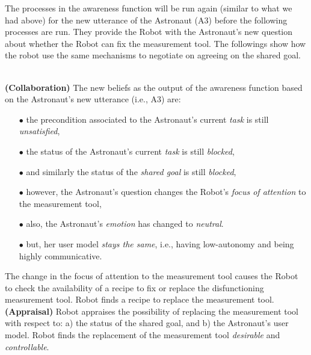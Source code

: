 The processes in the awareness function will be run again (similar to what we
had above) for the new utterance of the Astronaut (A3) before the following
processes are run. They provide the Robot with the Astronaut's new question
about whether the Robot can fix the measurement tool. The followings show how
the robot use the same mechanisms to negotiate on agreeing on the shared goal.

\noindent{}\\

\noindent\textbf{(Collaboration)} The new beliefs as the output of the awareness
function based on the Astronaut's new utterance (i.e., A3) are:

\begin{itemize}
  \item[$\bullet$] the precondition associated to the Astronaut's current
  \textit{task} is still \textit{unsatisfied},
  \item[$\bullet$] the status of the Astronaut's current \textit{task} is still
  \textit{blocked},
  \item[$\bullet$] and similarly the status of the \textit{shared goal} is
  still \textit{blocked},
  \item[$\bullet$] however, the Astronaut's question changes the Robot's
  \textit{focus of attention} to the measurement tool,
  \item[$\bullet$] also, the Astronaut's \textit{emotion} has changed to
  \textit{neutral}.
  \item[$\bullet$] but, her user model \textit{stays the same}, i.e.,
  having low-autonomy and being highly communicative.
\end{itemize}

The change in the focus of attention to the measurement tool causes the Robot to
check the availability of a recipe to fix or replace the disfunctioning
measurement tool. Robot finds a recipe to replace the measurement tool.\\

\noindent\textbf{(Appraisal)} Robot appraises the possibility of
replacing the measurement tool with respect to: a) the status of the shared
goal, and b) the Astronaut's user model. Robot finds the replacement of the
measurement tool \textit{desirable} and \textit{controllable}.\\

